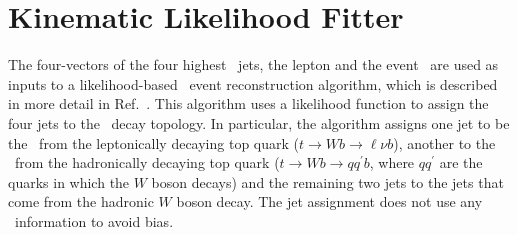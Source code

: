 \section{Kinematic Likelihood Fitter}
\label{KLFitter}
The four-vectors of the four highest \pt\ jets, the lepton and the
event \MET\ are used as inputs to a likelihood-based \ttbar\ event
reconstruction algorithm, which is described in more detail in
Ref.~\cite{ERDMANN201418}. This algorithm uses a likelihood function
to assign the four jets to the \ttbar\ decay topology. In particular,
the algorithm assigns one jet to be the \bjet\ from the leptonically
decaying top quark ($t\to Wb \to \ell \nu b$), another to the \bjet\
from the hadronically decaying top quark ($t\to Wb \to qq^\prime b$,
where $qq^\prime$ are the quarks in which the $W$ boson decays) and
the remaining two jets to the jets that come from the hadronic $W$
boson decay. The jet assignment does not use any \btagging\ information
to avoid bias.



